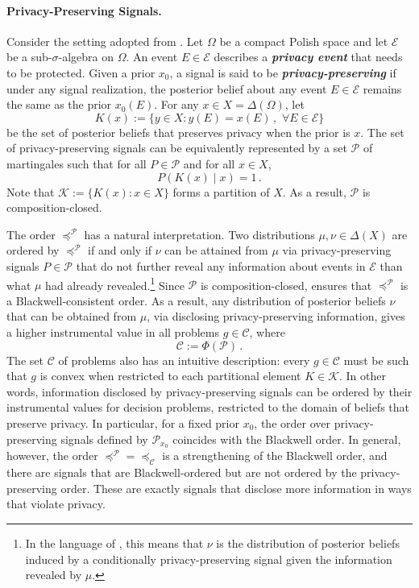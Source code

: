 \documentclass[12pt,letterpaper]{article}
\newenvironment{original}{\color{black}}{}
\theoremstyle{plain}
\theoremstyle{definition}
\theoremstyle{remark}
\newcommand{\Pc}{\mathcal{P}}
\newcommand{\C}{\mathcal{C}}
\theoremstyle{definition}
\begin{document}
\paragraph{Privacy-Preserving Signals.}\hspace{-2mm}
\begin{original}
Consider the setting adopted from \citet{strack2024privacy}. Let $\Omega$ be a compact Polish space and let $\mathcal{E}$ be a sub-$\sigma$-algebra on $\Omega$. An event $E \in \mathcal{E}$ describes a \emph{\textbf{privacy event}} that needs to be protected. Given a prior $x_0$, a signal is said to be \emph{\textbf{privacy-preserving}} if under any signal realization, the posterior belief about any event $E \in \mathcal{E}$ remains the same as the prior $x_0(E)$. For any $x \in X=\Delta(\Omega)$, let
\[
K(x):=\{y \in X: y(E)=x(E)\,, \, \, \forall E \in \mathcal{E}\}
\]
be the set of posterior beliefs that preserves privacy when the prior is $x$. The set of privacy-preserving signals can be equivalently represented by a set $\Pc$ of martingales such that for all $P \in \Pc$ and for all $x \in X$,
\[
P(K(x)\mid x)=1\,.
\]
Note that $\mathcal{K}:=\{K(x): x \in X\}$ forms a partition of $X$. As a result, $\Pc$ is composition-closed.

The order $\preceq^{\Pc}$ has a natural interpretation. Two distributions $\mu,\nu \in \Delta(X)$ are ordered by $\preceq^{\Pc}$ if and only if $\nu$ can be attained from $\mu$ via privacy-preserving signals $P \in \Pc$ that do not further reveal any information about events in $\mathcal{E}$ than what $\mu$ had already revealed.\footnote{In the language of \citet{strack2024privacy}, this means that $\nu$ is the distribution of posterior beliefs induced by a conditionally privacy-preserving signal given the information revealed by $\mu$.} Since $\Pc$ is composition-closed,  ensures that $\preceq^{\Pc}$ is a Blackwell-consistent order. As a result, any distribution of posterior beliefs $\nu$ that can be obtained from $\mu$, via disclosing privacy-preserving information, gives a higher instrumental value in all problems $g \in \C$, where
\[
\C:=\Phi(\Pc)\,.
\]
The set $\C$ of problems also has an intuitive description: every $g \in \C$ must be such that $g$ is convex when restricted to each partitional element $K \in \mathcal{K}$. In other words, information disclosed by privacy-preserving signals can be ordered by their instrumental values for decision problems, restricted to the domain of beliefs that preserve privacy. In particular, for a fixed prior $x_0$, the order over privacy-preserving signals defined by $\Pc_{x_0}$ coincides with the Blackwell order. In general, however, the order $\preceq^{\Pc}=\preceq_{\C}$ is a strengthening of the Blackwell order, and there are signals that are Blackwell-ordered but are not ordered by the privacy-preserving order. These are exactly signals that disclose more information in ways that violate privacy.


\end{original}
\end{document}
